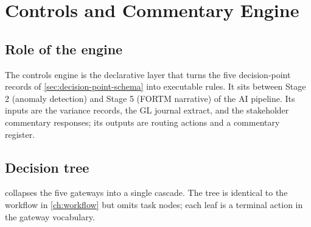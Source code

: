 \chapter{Controls and Commentary Engine}\label{ch:controls-engine}

\section{Role of the engine}

The controls engine is the declarative layer that turns the five
decision-point records of \cref{sec:decision-point-schema} into
executable rules. It sits between Stage 2 (anomaly detection) and
Stage 5 (FORTM narrative) of the AI pipeline. Its inputs are the
variance records, the GL journal extract, and the stakeholder
commentary responses; its outputs are routing actions and a
commentary register.

\section{Decision tree}

 collapses the five gateways into a single
cascade. The tree is identical to the workflow in \cref{ch:workflow}
but omits task nodes; each leaf is a terminal action in the gateway
vocabulary.

